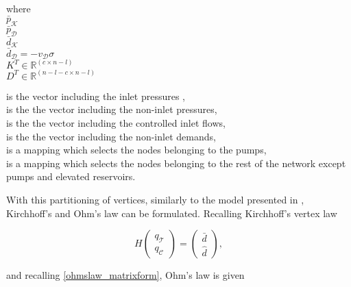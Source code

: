  \begin{minipage}[t]{0.3\textwidth}
where\\
\hspace*{8mm} $\bar{p}_{\mathcal{K}}$ \\
\hspace*{8mm} $\bar{p}_{\mathcal{D}}$  \\
\hspace*{8mm} $\bar{d}_{\mathcal{K}}$ \\
\hspace*{8mm} $\bar{d}_{\mathcal{D}} = -v_{\mathcal{D}} \sigma$  \\
\hspace*{8mm} $K^T \in  \mathbb{R}^{(c  \times n-l)}$ \\
\newline
\hspace*{8mm} $D^T \in  \mathbb{R}^{(n-l-c  \times n-l)}$
\end{minipage}
\begin{minipage}[t]{0.68\textwidth}
\vspace*{2mm}
is the vector including the inlet pressures ,\\
is the the vector including the non-inlet pressures, \\
is the the vector including the controlled inlet flows, \\
is the the vector including the non-inlet demands, \\
is a mapping which selects the nodes belonging to the pumps, \\
is a mapping which selects the nodes belonging to the rest of the network except pumps and elevated reservoirs.
\end{minipage}

With this partitioning of vertices, similarly to the model presented in , Kirchhoff's and Ohm's law can be formulated. Recalling Kirchhoff's vertex law

\begin{equation}
\label{kirchhoffslaw_matrix}
H
 \begin{pmatrix} 
 q_\mathcal{T} \\[3pt]
 q_\mathcal{C} 
 \end{pmatrix}
 =
\begin{pmatrix} 
 \bar{d}  \\[3pt] 
 \hat{d}  
 \end{pmatrix},
\end{equation}

and recalling \eqref{ohmslaw_matrixform}, Ohm's law is given

